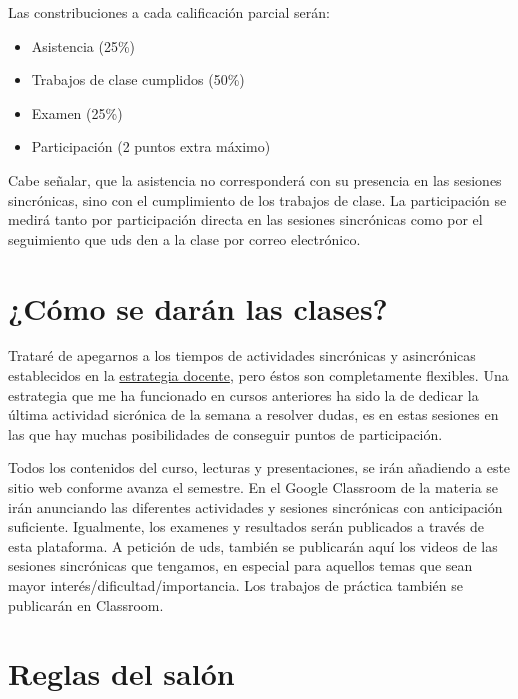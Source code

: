 \documentclass[
]{book}
\providecommand{\tightlist}{%
  \setlength{\itemsep}{0pt}\setlength{\parskip}{0pt}}
\begin{document}
Las constribuciones a cada calificación parcial serán:

\begin{itemize}
\tightlist
\item
  Asistencia (25\%)
\item
  Trabajos de clase cumplidos (50\%)
\item
  Examen (25\%)
\item
  Participación (2 puntos extra máximo)
\end{itemize}

Cabe señalar, que la asistencia no corresponderá con su presencia en las sesiones sincrónicas, sino con el cumplimiento de los trabajos de clase. La participación se medirá tanto por participación directa en las sesiones sincrónicas como por el seguimiento que uds den a la clase por correo electrónico.

\hypertarget{cuxf3mo-se-daruxe1n-las-clases}{%
\section{¿Cómo se darán las clases?}\label{cuxf3mo-se-daruxe1n-las-clases}}

Trataré de apegarnos a los tiempos de actividades sincrónicas y asincrónicas establecidos en la \href{Estrategia-docente.pdf}{estrategia docente}, pero éstos son completamente flexibles. Una estrategia que me ha funcionado en cursos anteriores ha sido la de dedicar la última actividad sicrónica de la semana a resolver dudas, es en estas sesiones en las que hay muchas posibilidades de conseguir puntos de participación.

Todos los contenidos del curso, lecturas y presentaciones, se irán añadiendo a este sitio web conforme avanza el semestre. En el Google Classroom de la materia se irán anunciando las diferentes actividades y sesiones sincrónicas con anticipación suficiente. Igualmente, los examenes y resultados serán publicados a través de esta plataforma. A petición de uds, también se publicarán aquí los videos de las sesiones sincrónicas que tengamos, en especial para aquellos temas que sean mayor interés/dificultad/importancia. Los trabajos de práctica también se publicarán en Classroom.

\hypertarget{reglas-del-saluxf3n}{%
\section{Reglas del salón}\label{reglas-del-saluxf3n}}
\end{document}
